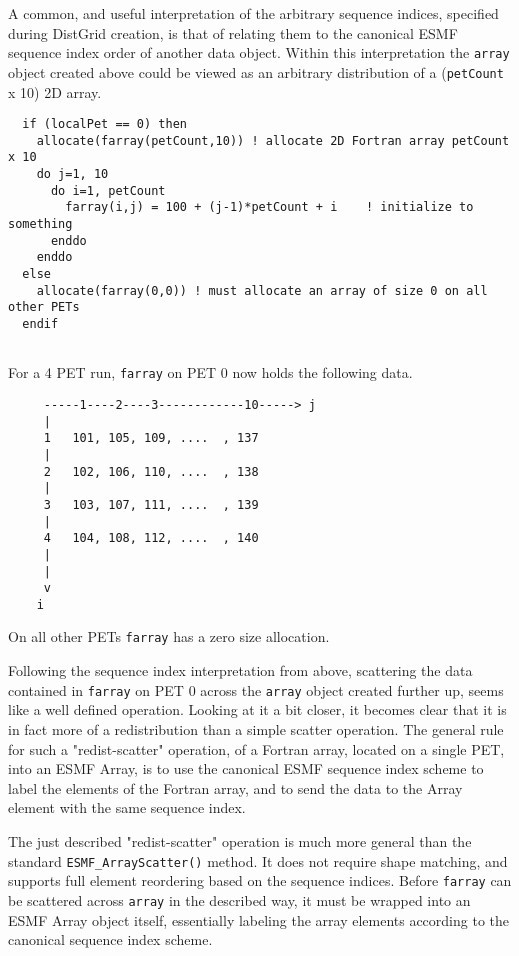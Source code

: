    A common, and useful interpretation of the arbitrary sequence indices, 
   specified during DistGrid creation, is that of relating them to the 
   canonical ESMF sequence index order of another data object. Within this
   interpretation the {\tt array} object created above could be viewed as an
   arbitrary distribution of a ({\tt petCount} x 10) 2D array. 
   

 \begin{verbatim}
  if (localPet == 0) then
    allocate(farray(petCount,10)) ! allocate 2D Fortran array petCount x 10
    do j=1, 10
      do i=1, petCount
        farray(i,j) = 100 + (j-1)*petCount + i    ! initialize to something
      enddo
    enddo
  else
    allocate(farray(0,0)) ! must allocate an array of size 0 on all other PETs
  endif
 
\end{verbatim}
 

   For a 4 PET run, {\tt farray} on PET 0 now holds the following data.
   \begin{verbatim}
     -----1----2----3------------10-----> j
     |
     1   101, 105, 109, ....  , 137
     |
     2   102, 106, 110, ....  , 138
     |
     3   103, 107, 111, ....  , 139
     |
     4   104, 108, 112, ....  , 140
     |
     |
     v
    i
   \end{verbatim}
  
   On all other PETs {\tt farray} has a zero size allocation.
  
   Following the sequence index interpretation from above, scattering the data
   contained in {\tt farray} on PET 0 across the {\tt array} object created
   further up, seems like a well defined operation. Looking at it a bit closer,
   it becomes clear that it is in fact more of a redistribution than a simple
   scatter operation. The general rule for such a "redist-scatter"  operation,
   of a Fortran array, located on a single PET, into an ESMF Array, is to 
   use the canonical ESMF sequence index scheme to label the elements of the
   Fortran array, and to send the data to the Array element with the same
   sequence index.
  
   The just described "redist-scatter" operation is much more general than
   the standard {\tt ESMF\_ArrayScatter()} method. It does not require shape
   matching, and supports full element reordering based on the sequence indices.
   Before {\tt farray} can be scattered across {\tt array} in the described way,
   it must be wrapped into an ESMF Array object itself, essentially labeling the
   array elements according to the canonical sequence index scheme.
    
